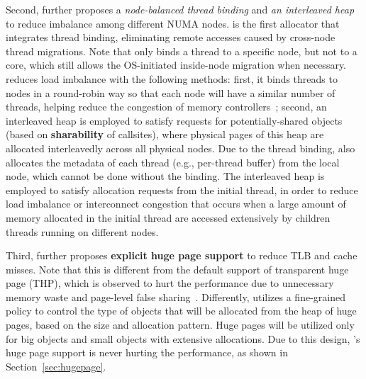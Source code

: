 Second, \NM{} further proposes a \textit{node-balanced thread binding} and \textit{an interleaved heap} to reduce imbalance among different NUMA nodes. \NM{} is the first allocator that integrates thread binding, eliminating remote accesses caused by cross-node thread migrations. Note that \NM{} only binds a thread to a specific node, but not to a core, which still allows the OS-initiated inside-node migration when necessary. \NM{} reduces load imbalance with the following methods: first, it binds threads to nodes in a round-robin way so that each node will have a similar number of threads, helping reduce the congestion of memory controllers~\cite{Blagodurov:2011:CNC:2002181.2002182}; second, an interleaved heap is employed to satisfy requests for potentially-shared objects (based on \textbf{sharability} of callsites), where physical pages of this heap are allocated interleavedly across all physical nodes. Due to the thread binding, \NM{} also allocates the metadata of each thread (e.g., per-thread buffer) from the local node, which cannot be done without the binding. The interleaved heap is employed to satisfy allocation requests from the initial thread, in order to reduce load imbalance or interconnect congestion that occurs when a large amount of memory allocated in the initial thread are accessed extensively by children threads running on different nodes. 
 
Third, \NM{} further proposes \textbf{explicit huge page support} to reduce TLB and cache misses. Note that this is different from the default support of transparent huge page (THP), which is observed to hurt the performance due to unnecessary memory waste and page-level false sharing~\cite{Gaud:2014:LPM:2643634.2643659, DBLP:conf/asplos/PanwarBG19, DBLP:conf/asplos/MaasAIJMR20}. Differently, \NM{} utilizes a fine-grained policy to control the type of objects that will be allocated from the heap of huge pages, based on the size and allocation pattern. Huge pages will be utilized only for big objects and small objects with extensive allocations. Due to this design, \NM{}'s huge page support is never hurting the performance, as shown in Section~\ref{sec:hugepage}. 
 

